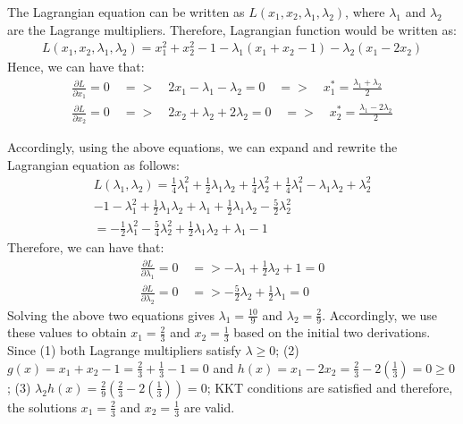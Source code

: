 \documentclass[12pt,a4paper]{article}
\begin{document}
	\noindent The Lagrangian equation can be written as $L(x_1, x_2, \lambda_1, \lambda_2)$, where $\lambda_1$ and $\lambda_2$ are the Lagrange multipliers. Therefore, Lagrangian function would be written as:
	\begin{align*}
		L(x_1, x_2, \lambda_1, \lambda_2) = x_1^2 +x_2^2-1 - \lambda_1(x_1 +x_2-1)-\lambda_2(x_1-2x_2)
	\end{align*}
	Hence, we can have that:
	\begin{align*}
		\frac{\partial L}{\partial x_1}=0 \quad => \quad 2x_1-\lambda_1-\lambda_2=0 \quad => \quad x_1^* = \frac{\lambda_1+\lambda_2}{2}\\
		\frac{\partial L}{\partial x_2}=0 \quad => \quad 2x_2+\lambda_2+2\lambda_2=0 \quad => \quad x_2^* = \frac{\lambda_1-2\lambda_2}{2}
	\end{align*}
	
	\noindent Accordingly, using the above equations, we can expand and rewrite the Lagrangian equation as follows:
	\begin{align*}
		L(\lambda_1, \lambda_2) = \frac{1}{4}\lambda_1^2+\frac{1}{2}\lambda_1\lambda_2+\frac{1}{4}\lambda_2^2 
		+\frac{1}{4}\lambda_1^2-\lambda_1\lambda_2+\lambda_2^2 \\
		-1 
		-\lambda_1^2+\frac{1}{2}\lambda_1\lambda_2+\lambda_1
		+\frac{1}{2}\lambda_1\lambda_2-\frac{5}{2}\lambda_2^2 \\
		= -\frac{1}{2}\lambda_1^2-\frac{5}{4}\lambda_2^2+\frac{1}{2}\lambda_1\lambda_2+\lambda_1-1 \qquad \quad
	\end{align*}
	Therefore, we can have that:
	\begin{align*}
	\frac{\partial L}{\partial \lambda_1}=0 \quad => -\lambda_1+\frac{1}{2}\lambda_2+1=0 \\
	\frac{\partial L}{\partial \lambda_2}=0 \quad => -\frac{5}{2}\lambda_2+\frac{1}{2}\lambda_1=0
	\end{align*}
	Solving the above two equations gives $\lambda_1=\frac{10}{9}$ and $\lambda_2 = \frac{2}{9}$. Accordingly, we use these values to obtain $x_1=\frac{2}{3}$ and $x_2=\frac{1}{3}$ based on the initial two derivations. Since (1) both Lagrange multipliers satisfy $\lambda\geq 0$; (2) $g(x)=x_1+x_2-1 = \frac{2}{3}+\frac{1}{3}-1=0$ and $h(x)=x_1-2x_2 = \frac{2}{3}-2(\frac{1}{3})=0\geq 0$; (3) $\lambda_2h(x) = \frac{2}{9}(\frac{2}{3}-2(\frac{1}{3}))=0 $; KKT conditions are satisfied and therefore, the solutions $x_1=\frac{2}{3}$ and $x_2=\frac{1}{3}$ are valid.
	
	
	
\end{document}
